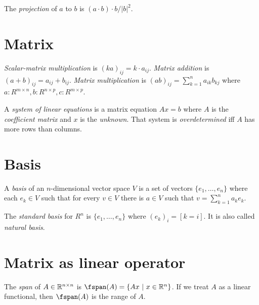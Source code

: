 %
%
%
The \emph{projection} of \(a\) to \(b\) is \((a \cdot b) \cdot b / |b|^2\).

\section{Matrix}

%
\emph{Scalar-matrix multiplication} is \((ka)_{ij} = k \cdot a_{ij}\).
%
%
\emph{Matrix addition} is \((a + b)_{ij} = a_{ij} + b_{ij}\).
%
%
\emph{Matrix multiplication} is \((ab)_{ij} = \sum_{k=1}^n a_{ik} b_{kj}\) where
\(a : R^{m \times n}, b : R^{n \times p}, c : R^{m \times p}\).

%
%
%
%
A \emph{system of linear equations} is a matrix equation \(A x = b\)
where \(A\) is the \emph{coefficient matrix} and \(x\) is the \emph{unknown}.
%
%
That system is \emph{overdetermined} iff \(A\) has more rows than columns.

\section{Basis}

A
%
%
\emph{basis} of an \(n\)-dimensional vector space \(V\) is a set of vectors \(\{e_1,\ldots,e_n\}\) where each \(e_k \in V\)
such that for every \(v \in V\) there is \(a \in V\) such that \(v = \sum_{k=1}^n a_k e_k\).

The
%
%
\emph{standard basis} for \(R^n\) is \(\{ e_1, \ldots, e_n\}\) where
\( (e_k)_i = [ k = i ] \).
It is also called \emph{natural basis}.

\section{Matrix as linear operator}

The
%
\emph{span} of \(A \in \mathbb{R}^{n\times n}\) is $\fspan(A) = \{ Ax ~|~ x \in \Real^n \}$.
If we treat \(A\) as a linear functional,
then \(\fspan(A)\) is the range of \(A\).


